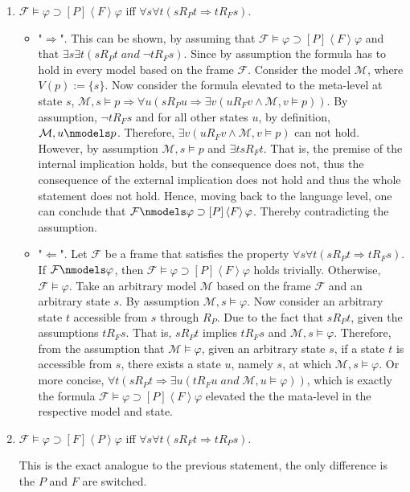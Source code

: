 \documentclass[11pt,a4paper]{article}
\newcommand{\lto}{\supset}
\newcommand{\tall}[1]{\left[ #1 \right]}
\newcommand{\tsome}[1]{\left\langle  #1 \right\rangle}
\newcommand{\sand}{\; and \;}
\newcommand{\sto}{\Rightarrow}
\begin{document}
\begin{enumerate}
\item $\mathcal{F}\models \varphi \lto \tall{P} \tsome{F} \varphi$ iff $\forall s \forall	t (sR_Pt \sto tR_Fs)$.
\begin{itemize}
\item "$\Longrightarrow$".
This can be shown, by  assuming that $\mathcal{F}\models \varphi \lto \tall{P} \tsome{F} \varphi$ and that $\exists s \exists t (sR_Pt \sand \neg tR_Fs)$. Since by assumption the formula has to hold in every model based on the frame $\mathcal{F}$. Consider the model $\mathcal{M}$, where $V(p):= \{s\}$. Now consider the formula elevated to the meta-level at state $s$, $\mathcal{M},s \models p \sto \forall u (sR_Pu \sto \exists v (uR_Fv \land \mathcal{M},v \models p))$. By assumption, $\neg tR_Fs$ and for all other states $u$, by definition, $\mathcal{M}, u \nmodels p$. Therefore, $ \exists v (uR_Fv \land \mathcal{M},v \models p)$ can not hold. However, by assumption $\mathcal{M},s \models p$ and $\exists t sR_Ft$. That is, the premise of the internal implication holds, but the consequence does not, thus the consequence of the external implication does not hold and thus the whole statement does not hold. Hence, moving back to the language level, one can conclude that $\mathcal{F}\nmodels \varphi \lto \tall{P} \tsome{F} \varphi$. Thereby contradicting the assumption.

\item "$\Longleftarrow$".
Let $\mathcal{F}$ be a frame that satisfies the property $\forall s \forall	t (sR_Pt \sto tR_Fs)$.
If $\mathcal{F} \nmodels \varphi$, then $\mathcal{F}\models \varphi \lto \tall{P} \tsome{F} \varphi$ holds trivially. Otherwise, $\mathcal{F} \models \varphi$. Take an arbitrary model $\mathcal{M}$ based on the frame $\mathcal{F}$ and an arbitrary state $s$. By assumption $\mathcal{M}, s \models \varphi$. Now consider an arbitrary state $t$ accessible from $s$ through $R_P$. Due to the fact that $sR_Pt$, given the assumptions $tR_Fs$. That is, $sR_Pt$ implies $tR_Fs$ and $\mathcal{M},s \models \varphi$. Therefore, from the assumption that $\mathcal{M} \models \varphi$, given an arbitrary state $s$, if a state $t$ is accessible from $s$, there exists a state $u$, namely $s$, at which $\mathcal{M},s \models \varphi$. Or more concise, $\forall t (sR_Pt \sto \exists u (tR_Fu \sand \mathcal{M},u \models \varphi))$, which is exactly the formula $\mathcal{F}\models \varphi \lto \tall{P} \tsome{F} \varphi$ elevated the the mata-level in the respective model and state.

\end{itemize}

\item $\mathcal{F}\models \varphi \lto \tall{F} \tsome{P} \varphi$ iff $\forall s \forall	t (sR_Ft \sto tR_Ps)$.

This is the exact analogue to the previous statement, the only difference is the $P$ and $F$ are switched.

\end{enumerate}
\end{document}
